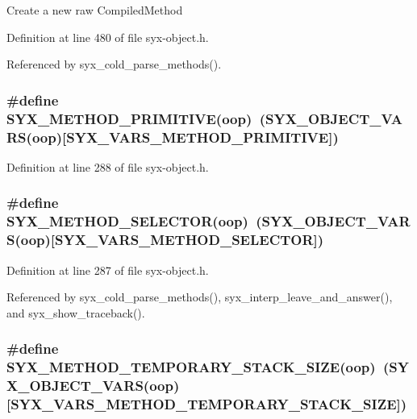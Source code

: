 Create a new raw CompiledMethod 

Definition at line 480 of file syx-object.h.

Referenced by syx\_\-cold\_\-parse\_\-methods().\hypertarget{syx-object_8h_539c213e23ecd6648b7219ba0f1fe40b}{
\subsubsection{\setlength{\rightskip}{0pt plus 5cm}\#define SYX\_\-METHOD\_\-PRIMITIVE(oop)~(SYX\_\-OBJECT\_\-VARS(oop)\mbox{[}SYX\_\-VARS\_\-METHOD\_\-PRIMITIVE\mbox{]})}}
\label{syx-object_8h_539c213e23ecd6648b7219ba0f1fe40b}




Definition at line 288 of file syx-object.h.\hypertarget{syx-object_8h_e98de75db34b515c3f1141bd3edbccd4}{
\subsubsection{\setlength{\rightskip}{0pt plus 5cm}\#define SYX\_\-METHOD\_\-SELECTOR(oop)~(SYX\_\-OBJECT\_\-VARS(oop)\mbox{[}SYX\_\-VARS\_\-METHOD\_\-SELECTOR\mbox{]})}}
\label{syx-object_8h_e98de75db34b515c3f1141bd3edbccd4}




Definition at line 287 of file syx-object.h.

Referenced by syx\_\-cold\_\-parse\_\-methods(), syx\_\-interp\_\-leave\_\-and\_\-answer(), and syx\_\-show\_\-traceback().\hypertarget{syx-object_8h_9cfacc4bce3b3d7004afe33c25b9d2c7}{
\subsubsection{\setlength{\rightskip}{0pt plus 5cm}\#define SYX\_\-METHOD\_\-TEMPORARY\_\-STACK\_\-SIZE(oop)~(SYX\_\-OBJECT\_\-VARS(oop)\mbox{[}SYX\_\-VARS\_\-METHOD\_\-TEMPORARY\_\-STACK\_\-SIZE\mbox{]})}}
\label{syx-object_8h_9cfacc4bce3b3d7004afe33c25b9d2c7}




